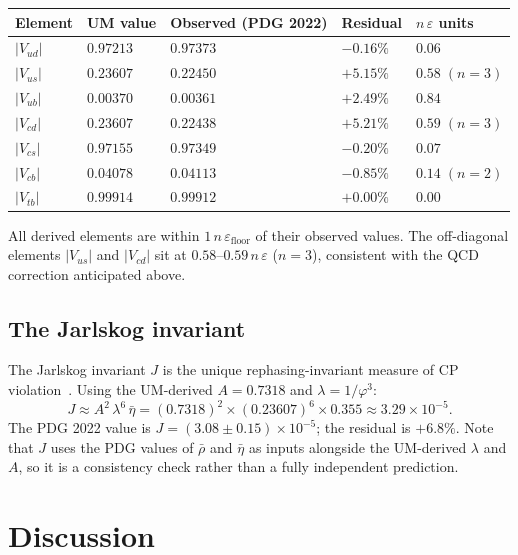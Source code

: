 \documentclass[12pt]{article}
\begin{document}
\begin{center}
\begin{tabular}{lllll}
\toprule
Element & UM value & Observed (PDG 2022) & Residual & $n\,\varepsilon$ units \\
\midrule
$|V_{ud}|$ & $0.97213$ & $0.97373$ & $-0.16\%$ & $0.06$ \\
$|V_{us}|$ & $0.23607$ & $0.22450$ & $+5.15\%$ & $0.58\;(n{=}3)$ \\
$|V_{ub}|$ & $0.00370$ & $0.00361$ & $+2.49\%$ & $0.84$ \\
$|V_{cd}|$ & $0.23607$ & $0.22438$ & $+5.21\%$ & $0.59\;(n{=}3)$ \\
$|V_{cs}|$ & $0.97155$ & $0.97349$ & $-0.20\%$ & $0.07$ \\
$|V_{cb}|$ & $0.04078$ & $0.04113$ & $-0.85\%$ & $0.14\;(n{=}2)$ \\
$|V_{tb}|$ & $0.99914$ & $0.99912$ & $+0.00\%$ & $0.00$ \\
\bottomrule
\end{tabular}
\end{center}

All derived elements are within $1\,n\,\varepsilon_{\text{floor}}$ of
their observed values. The off-diagonal elements $|V_{us}|$ and $|V_{cd}|$
sit at $0.58$--$0.59\,n\,\varepsilon$ ($n = 3$), consistent with the QCD
correction anticipated above.

\subsection{The Jarlskog invariant}

The Jarlskog invariant $J$ is the unique rephasing-invariant measure of
CP violation~\cite{Jarlskog1985}. Using the UM-derived $A = 0.7318$ and
$\lambda = 1/\varphi^3$:
\begin{equation}
  J \approx A^2\,\lambda^6\,\bar\eta
  = (0.7318)^2 \times (0.23607)^6 \times 0.355
  \approx 3.29 \times 10^{-5}.
  \label{eq:J}
\end{equation}
The PDG 2022 value is $J = (3.08 \pm 0.15)\times 10^{-5}$; the residual
is $+6.8\%$. Note that $J$ uses the PDG values of $\bar\rho$ and $\bar\eta$
as inputs alongside the UM-derived $\lambda$ and $A$, so it is a
consistency check rather than a fully independent prediction.

\section{Discussion}
\end{document}
